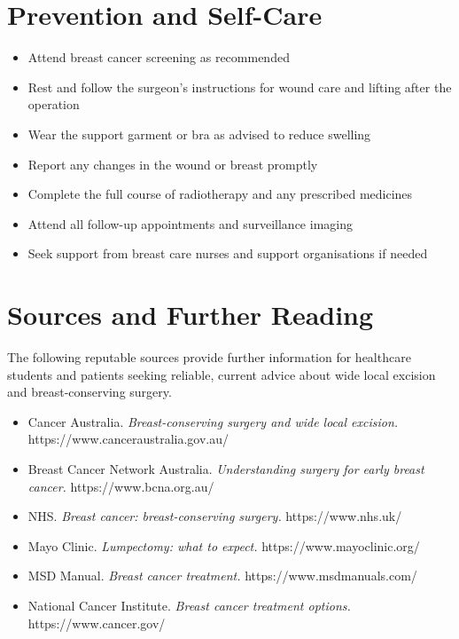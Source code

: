 \section*{Prevention and Self-Care}
\begin{itemize}
    \item Attend breast cancer screening as recommended
    \item Rest and follow the surgeon's instructions for wound care and lifting after the operation
    \item Wear the support garment or bra as advised to reduce swelling
    \item Report any changes in the wound or breast promptly
    \item Complete the full course of radiotherapy and any prescribed medicines
    \item Attend all follow-up appointments and surveillance imaging
    \item Seek support from breast care nurses and support organisations if needed
\end{itemize}

\section*{Sources and Further Reading}
The following reputable sources provide further information for healthcare students and patients seeking reliable, current advice about wide local excision and breast-conserving surgery.
\begin{itemize}
    \item Cancer Australia. \textit{Breast-conserving surgery and wide local excision.} https://www.canceraustralia.gov.au/
    \item Breast Cancer Network Australia. \textit{Understanding surgery for early breast cancer.} https://www.bcna.org.au/
    \item NHS. \textit{Breast cancer: breast-conserving surgery.} https://www.nhs.uk/
    \item Mayo Clinic. \textit{Lumpectomy: what to expect.} https://www.mayoclinic.org/
    \item MSD Manual. \textit{Breast cancer treatment.} https://www.msdmanuals.com/
    \item National Cancer Institute. \textit{Breast cancer treatment options.} https://www.cancer.gov/
\end{itemize}
